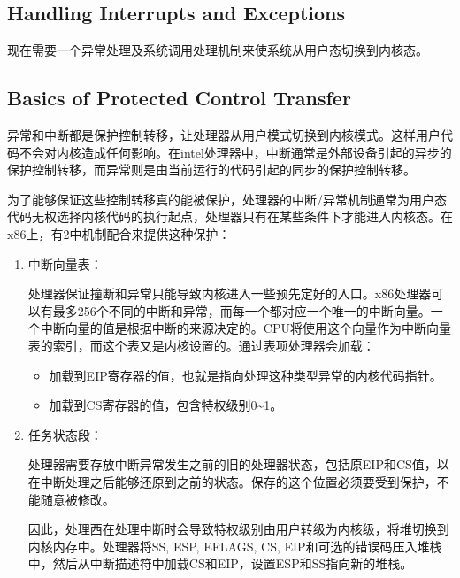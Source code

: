 \subsection{Handling Interrupts and Exceptions}
\par 现在需要一个异常处理及系统调用处理机制来使系统从用户态切换到内核态。

\subsection{Basics of Protected Control Transfer}
\par 异常和中断都是保护控制转移，让处理器从用户模式切换到内核模式。这样用户代码不会对内核造成任何影响。在intel处理器中，中断通常是外部设备引起的异步的保护控制转移，而异常则是由当前运行的代码引起的同步的保护控制转移。
\par 为了能够保证这些控制转移真的能被保护，处理器的中断/异常机制通常为用户态代码无权选择内核代码的执行起点，处理器只有在某些条件下才能进入内核态。在x86上，有2中机制配合来提供这种保护：
\begin{enumerate}
    \item 中断向量表：
        \par 处理器保证撞断和异常只能导致内核进入一些预先定好的入口。x86处理器可以有最多256个不同的中断和异常，而每一个都对应一个唯一的中断向量。一个中断向量的值是根据中断的来源决定的。CPU将使用这个向量作为中断向量表的索引，而这个表又是内核设置的。通过表项处理器会加载：
        \begin{itemize}
            \item 加载到EIP寄存器的值，也就是指向处理这种类型异常的内核代码指针。
            \item 加载到CS寄存器的值，包含特权级别0\textasciitilde 1。
        \end{itemize}
    \item 任务状态段：
        \par 处理器需要存放中断异常发生之前的旧的处理器状态，包括原EIP和CS值，以在中断处理之后能够还原到之前的状态。保存的这个位置必须要受到保护，不能随意被修改。
        \par 因此，处理西在处理中断时会导致特权级别由用户转级为内核级，将堆切换到内核内存中。处理器将SS, ESP, EFLAGS, CS, EIP和可选的错误码压入堆栈中，然后从中断描述符中加载CS和EIP，设置ESP和SS指向新的堆栈。
\end{enumerate}


